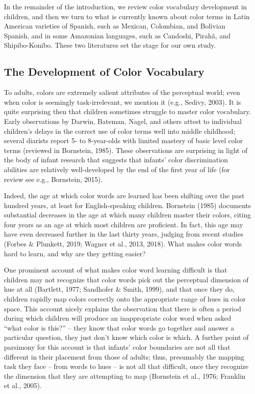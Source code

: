 \documentclass[
  english,
  ,apa7,floatsintext]{apa6}
\begin{document}
In the remainder of the introduction, we review color vocabulary development in children, and then we turn to what is currently known about color terms in Latin American varieties of Spanish, such as Mexican, Colombian, and Bolivian Spanish, and in some Amazonian languages, such as Candoshi, Pirahã, and Shipibo-Konibo. These two literatures set the stage for our own study.

\hypertarget{the-development-of-color-vocabulary}{%
\subsection{The Development of Color Vocabulary}\label{the-development-of-color-vocabulary}}

To adults, colors are extremely salient attributes of the perceptual world; even when color is seemingly task-irrelevant, we mention it (e.g., Sedivy, 2003). It is quite surprising then that children sometimes struggle to master color vocabulary. Early observations by Darwin, Bateman, Nagel, and others attest to individual children's delays in the correct use of color terms well into middle childhood; several diarists report 5- to 8-year-olds with limited mastery of basic level color terms (reviewed in Bornstein, 1985). These observations are surprising in light of the body of infant research that suggests that infants' color discrimination abilities are relatively well-developed by the end of the first year of life (for review see e.g., Bornstein, 2015).

Indeed, the age at which color words are learned has been shifting over the past hundred years, at least for English-speaking children. Bornstein (1985) documents substantial decreases in the age at which many children master their colors, citing four years as an age at which most children are proficient. In fact, this age may have even decreased further in the last thirty years, judging from recent studies (Forbes \& Plunkett, 2019; Wagner et al., 2013, 2018). What makes color words hard to learn, and why are they getting easier?

One prominent account of what makes color word learning difficult is that children may not recognize that color words pick out the perceptual dimension of hue at all (Bartlett, 1977; Sandhofer \& Smith, 1999), and that once they do, children rapidly map colors correctly onto the appropriate range of hues in color space. This account nicely explains the observation that there is often a period during which children will produce an inappropriate color word when asked ``what color is this?'' -- they know that color words go together and answer a particular question, they just don't know which color is which. A further point of parsimony for this account is that infants' color boundaries are not all that different in their placement from those of adults; thus, presumably the mapping task they face -- from words to hues -- is not all that difficult, once they recognize the dimension that they are attempting to map (Bornstein et al., 1976; Franklin et al., 2005).
\end{document}
